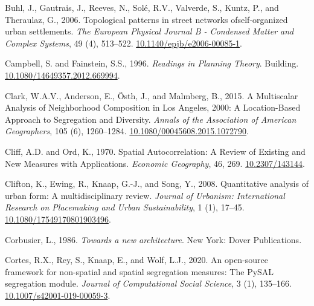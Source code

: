 \documentclass[
  10pt,
]{article}
\newlength{\cslhangindent}
\newenvironment{CSLReferences}[2] %
 {%
  \setlength{\parindent}{0pt}
  \ifodd #1 \everypar{\setlength{\hangindent}{\cslhangindent}}\ignorespaces\fi
  \ifnum #2 > 0
  \setlength{\parskip}{#2\baselineskip}
  \fi
 }%
 {}
\begin{document}
\begin{CSLReferences}{1}{0}
\leavevmode{}%
Buhl, J., Gautrais, J., Reeves, N., Solé, R.V., Valverde, S., Kuntz, P.,
and Theraulaz, G., 2006. Topological patterns in street networks
ofself-organized urban settlements. \emph{The European Physical Journal
B - Condensed Matter and Complex Systems}, 49 (4), 513--522.
\href{https://doi.org/10.1140/epjb/e2006-00085-1}{10.1140/epjb/e2006-00085-1}.

\leavevmode{}%
Campbell, S. and Fainstein, S.S., 1996. \emph{Readings in {Planning
Theory}}. Building.
\href{https://doi.org/10.1080/14649357.2012.669994}{10.1080/14649357.2012.669994}.

\leavevmode{}%
Clark, W.A.V., Anderson, E., Östh, J., and Malmberg, B., 2015. A
{Multiscalar Analysis} of {Neighborhood Composition} in {Los Angeles},
2000: {A Location-Based Approach} to {Segregation} and
{Diversity}. \emph{Annals of the Association of American Geographers},
105 (6), 1260--1284.
\href{https://doi.org/10.1080/00045608.2015.1072790}{10.1080/00045608.2015.1072790}.

\leavevmode{}%
Cliff, A.D. and Ord, K., 1970. Spatial {Autocorrelation}: {A Review} of
{Existing} and {New Measures} with {Applications}. \emph{Economic
Geography}, 46, 269.
\href{https://doi.org/10.2307/143144}{10.2307/143144}.

\leavevmode{}%
Clifton, K., Ewing, R., Knaap, G.-J., and Song, Y., 2008. Quantitative
analysis of urban form: A multidisciplinary review. \emph{Journal of
Urbanism: International Research on Placemaking and Urban
Sustainability}, 1 (1), 17--45.
\href{https://doi.org/10.1080/17549170801903496}{10.1080/17549170801903496}.

\leavevmode{}%
Corbusier, L., 1986. \emph{Towards a new architecture}. {New York}:
{Dover Publications}.

\leavevmode{}%
Cortes, R.X., Rey, S., Knaap, E., and Wolf, L.J., 2020. An open-source
framework for non-spatial and spatial segregation measures: The {PySAL}
segregation module. \emph{Journal of Computational Social Science}, 3
(1), 135--166.
\href{https://doi.org/10.1007/s42001-019-00059-3}{10.1007/s42001-019-00059-3}.


\end{CSLReferences}
\end{document}
